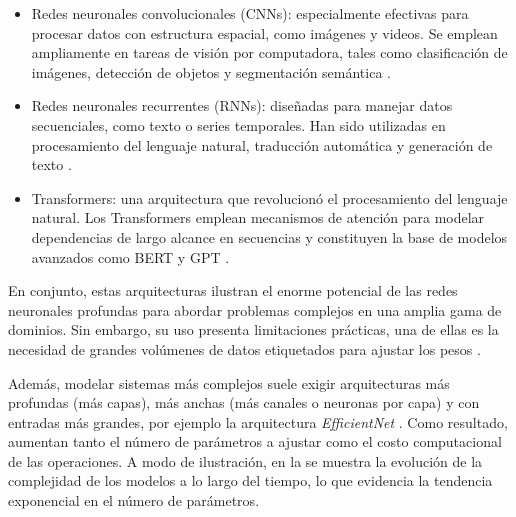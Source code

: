\begin{itemize}
\item Redes neuronales convolucionales (CNNs): especialmente efectivas para procesar datos con estructura espacial, como imágenes y videos. Se emplean ampliamente en tareas de visión por computadora, tales como clasificación de imágenes, detección de objetos y segmentación semántica \cite{lecun1998gradient}.
\item Redes neuronales recurrentes (RNNs): diseñadas para manejar datos secuenciales, como texto o series temporales. Han sido utilizadas en procesamiento del lenguaje natural, traducción automática y generación de texto \cite{hochreiter1997long}.
\item Transformers: una arquitectura que revolucionó el procesamiento del lenguaje natural. Los Transformers emplean mecanismos de atención para modelar dependencias de largo alcance en secuencias y constituyen la base de modelos avanzados como BERT y GPT \cite{vaswani2023attentionneed}.
\end{itemize}

En conjunto, estas arquitecturas ilustran el enorme potencial de las redes neuronales profundas para abordar problemas complejos en una amplia gama de dominios. Sin embargo, su uso presenta limitaciones prácticas, una de ellas es la necesidad de grandes volúmenes de datos etiquetados para ajustar los pesos \cite{Goodfellow2016}.

Además, modelar sistemas más complejos suele exigir arquitecturas más profundas (más capas), más anchas (más canales o neuronas por capa) y con entradas más grandes, por ejemplo la arquitectura \textit{EfficientNet} \cite{tan2020efficientnetrethinkingmodelscaling}. Como resultado, aumentan tanto el número de parámetros a ajustar como el costo computacional de las operaciones. A modo de ilustración, en la  se muestra la evolución de la complejidad de los modelos a lo largo del tiempo, lo que evidencia la tendencia exponencial en el número de parámetros.

